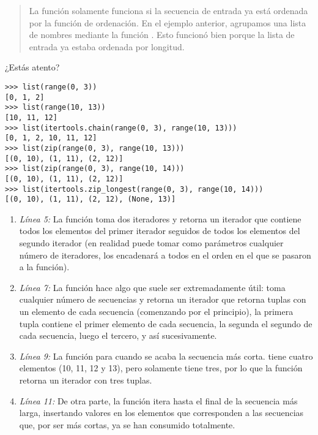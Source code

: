 \begin{quote}
La función  solamente funciona si la secuencia de entrada ya está ordenada por la función de ordenación. En el ejemplo anterior, agrupamos una lista de nombres mediante la función . Esto funcionó bien porque la lista de entrada ya estaba ordenada por longitud.
\end{quote}

¿Estás atento?

\noindent\begin{minipage}{\textwidth}
\begin{lstlisting}[mathescape=True]
>>> list(range(0, 3))
[0, 1, 2]
>>> list(range(10, 13))
[10, 11, 12]
>>> list(itertools.chain(range(0, 3), range(10, 13)))
[0, 1, 2, 10, 11, 12]
>>> list(zip(range(0, 3), range(10, 13)))           
[(0, 10), (1, 11), (2, 12)]
>>> list(zip(range(0, 3), range(10, 14)))          
[(0, 10), (1, 11), (2, 12)]
>>> list(itertools.zip_longest(range(0, 3), range(10, 14)))
[(0, 10), (1, 11), (2, 12), (None, 13)]
\end{lstlisting}
\end{minipage}

\begin{enumerate}

\item \emph{Línea 5:} La función  toma dos iteradores y retorna un iterador que contiene todos los elementos del primer iterador seguidos de todos los elementos del segundo iterador (en realidad puede tomar como parámetros cualquier número de iteradores, los encadenará a todos en el orden en el que se pasaron a la función).

\item \emph{Línea 7:} La función  hace algo que suele ser extremadamente útil: toma cualquier número de secuencias y retorna un iterador que retorna tuplas con un elemento de cada secuencia (comenzando por el principio), la primera tupla contiene el primer elemento de cada secuencia, la segunda el segundo de cada secuencia, luego el tercero, y así sucesivamente.

\item \emph{Línea 9:} La función  para cuando se acaba la secuencia más corta.  tiene cuatro elementos (10, 11, 12 y 13), pero  solamente tiene tres, por lo que la función  retorna un iterador con tres tuplas.

\item \emph{Línea 11:} De otra parte, la función  itera hasta el final de la secuencia más larga, insertando valores  en los elementos que corresponden a las secuencias que, por ser más cortas, ya se han consumido totalmente.

\end{enumerate}

